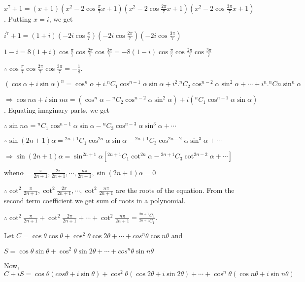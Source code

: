   $x^7 + 1 = (x + 1)\left(x^2 - 2\cos\frac{\pi}{7}x + 1\right)\left(x^2 -
  2\cos\frac{2\pi}{7}x + 1\right)\left(x^2 - 2\cos\frac{3\pi}{7}x +
  1\right)$. Putting $x = i$, we get

  $i^7 + 1 = (1 +
  i)\left(-2i\cos\frac{\pi}{7}\right)\left(-2i\cos\frac{2\pi}{7}\right)\left(-2i\cos\frac{3\pi}{7}\right)$

  $1 - i = 8(1 + i)\cos\frac{\pi}{7}\cos\frac{2\pi}{7}\cos\frac{3\pi}{7} = -8(1 -
  i)\cos\frac{\pi}{7}\cos\frac{2\pi}{7}\cos\frac{3\pi}{7}$

  $\therefore \cos\frac{\pi}{7}\cos\frac{2\pi}{7}\cos\frac{3\pi}{7} = -\frac{1}{8}$.
\item $(\cos\alpha + i \sin\alpha)^n = \cos^n\alpha + i.{{}^nC_1}\cos^{n-1}\alpha
  \sin\alpha + i^2.{^nC_2}\cos^{n-2}\alpha \sin^2\alpha + \cdots +
  i^n.{^nCn}\sin^n\alpha$

  $\Rightarrow \cos n\alpha + i \sin n\alpha = (\cos^n\alpha -
  {^nC_2}\cos^{n-2}\alpha \sin^2\alpha) + i({^nC_1}\cos^{n-1}\alpha
  \sin\alpha)$. Equating imaginary parts, we get

  $\therefore \sin n\alpha = {^nC_1}\cos^{n-1}\alpha \sin\alpha - {}^nC_3\cos^{n-3}\alpha \sin^3\alpha +
  \cdots$

  $\therefore \sin (2n+1)\alpha = {}^{2n+1}C_1\cos^{2n}\alpha \sin\alpha - {}^{2n+1}C_3\cos^{2n-2}\alpha
  \sin^3\alpha + \cdots$

  $\Rightarrow \sin (2n+1)\alpha = \sin^{2n+1}\alpha[{^{2n+1}C_1\cot^{2n}}\alpha -
    {}^{2n+1}C_3\cot^{2n-2}\alpha + \cdots]$

  $\text{when} \alpha = \frac{\pi}{2n+1}, \frac{2\pi}{2n+1}, \cdots, \frac{n\pi}{2n+1}, \sin(2n+1)\alpha =
  0$

  $\therefore \cot^2\frac{\pi}{2n+1}, \cot^2\frac{2\pi}{2n+1}, \cdots, \cot^2\frac{n\pi}{2n+1}$ are the
  roots of the equation. From the second term coefficient we get sum of roots in a polynomial.

  $\therefore \cot^2\frac{\pi}{2n+1}+ \cot^2\frac{2\pi}{2n+1}+ \cdots+ \cot^2\frac{n\pi}{2n+1} =
  \frac{{}^{2n+1}C_3}{{}^{2n+1}C_1}$.
\item Let $C = \cos\theta \cos\theta + \cos^2\theta \cos 2\theta + \cdots + cos^n\theta \cos n\theta$
  and

  $S = \cos\theta \sin\theta + \cos^2\theta \sin 2\theta + \cdots + cos^n\theta \sin n\theta$

  Now, $C + iS = \cos\theta(cos\theta + i \sin\theta) + \cos^2\theta(\cos2\theta + i \sin 2\theta) + \cdots
  + \cos^n\theta(\cos n\theta + i \sin n\theta)$

